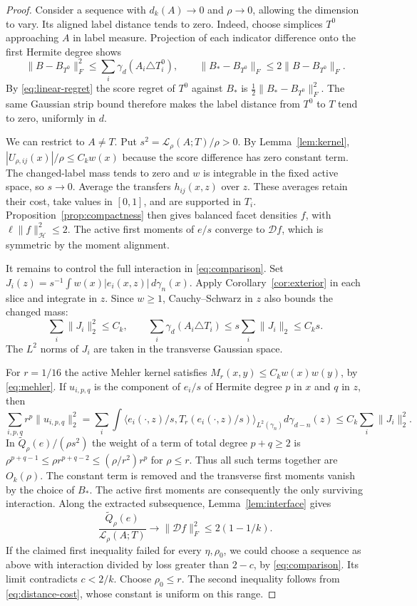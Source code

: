\documentclass[11pt,reqno]{amsart}
\newcommand{\norm}[1]{\lVert #1\rVert}
\newcommand{\ga}{\gamma}
\newcommand{\LL}{\mathcal L}
\newcommand{\HH}{\mathcal H}
\newcommand{\DD}{\mathcal D}
\begin{document}
\begin{proof}
Consider a sequence with $d_k(A)\to0$ and $\rho\to0$, allowing the
dimension to vary. Its aligned label distance tends to zero. Indeed,
choose simplices $T^0$ approaching $A$ in label measure. Projection of
each indicator difference onto the first Hermite degree shows
\[
 \norm{B-B_{T^0}}_F^2\le\sum_i\ga_d(A_i\triangle T_i^0),\qquad
 \norm{B_*-B_{T^0}}_F\le 2\norm{B-B_{T^0}}_F .
\]
By \eqref{eq:linear-regret} the score regret of $T^0$ against $B_*$
is $\tfrac12\norm{B_*-B_{T^0}}_F^2$. The same Gaussian strip bound
therefore makes the label distance from $T^0$ to $T$ tend to zero,
uniformly in $d$.

We can restrict to $A\ne T$. Put $s^2=\LL_\rho(A;T)/\rho>0$.
By Lemma~\ref{lem:kernel}, $|U_{\rho,ij}(x)|/\rho\le C_k w(x)$
because the score difference has zero constant term. The changed-label
mass tends to zero and $w$ is integrable in the fixed active space,
so $s\to0$. Average the transfers $h_{ij}(x,z)$ over $z$. These
averages retain their cost, take values in $[0,1]$, and are supported
in $T_i$. Proposition~\ref{prop:compactness} then gives balanced facet
densities $f$, with $\ell\norm f_\HH^2\le2$. The active first moments
of $e/s$ converge to $\DD f$, which is symmetric by the moment
alignment.

It remains to control the full interaction in \eqref{eq:comparison}.
Set $J_i(z)=s^{-1}\int w(x)|e_i(x,z)|\,d\ga_n(x)$.
Apply Corollary~\ref{cor:exterior} in each slice and integrate in $z$.
Since $w\ge1$, Cauchy--Schwarz in $z$ also bounds the changed mass:
\begin{equation}\label{eq:distance-cost}
 \sum_i\norm{J_i}_2^2\le C_k,\qquad
 \sum_i\ga_d(A_i\triangle T_i)\le s\sum_i\norm{J_i}_2\le C_k s.
\end{equation}
The $L^2$ norms of $J_i$ are taken in the transverse Gaussian space.

For $r=1/16$ the active Mehler kernel satisfies
$M_r(x,y)\le C_k w(x)w(y)$, by \eqref{eq:mehler}. If $u_{i,p,q}$
is the component of $e_i/s$ of Hermite degree $p$ in $x$ and $q$ in
$z$, then
\[
 \sum_{i,p,q} r^p\norm{u_{i,p,q}}_2^2
 =\sum_i\int\big\langle e_i(\cdot,z)/s,
                 T_r(e_i(\cdot,z)/s)\big\rangle_{L^2(\ga_n)}
            d\ga_{d-n}(z)
 \le C_k\sum_i\norm{J_i}_2^2.
\]
In $\widetilde Q_\rho(e)/(\rho s^2)$ the weight of a term of total
degree $p+q\ge2$ is
$\rho^{p+q-1}\le \rho r^{p+q-2}\le(\rho/r^2)r^p$ for $\rho\le r$.
Thus all such terms together are $O_k(\rho)$. The constant term is removed and
the transverse first moments vanish by the choice of $B_*$. The
active first moments are consequently the only surviving interaction.
Along the extracted subsequence, Lemma~\ref{lem:interface} gives
\[
 \frac{\widetilde Q_\rho(e)}{\LL_\rho(A;T)}
      \longrightarrow\norm{\DD f}_F^2\le 2(1-1/k).
\]
If the claimed first inequality failed for every $\eta,\rho_0$, we
could choose a sequence as above with interaction divided by loss
greater than $2-c$, by \eqref{eq:comparison}. Its limit contradicts
$c<2/k$. Choose $\rho_0\le r$. The second inequality follows from
\eqref{eq:distance-cost}, whose constant is uniform on this range.
\end{proof}
\end{document}
